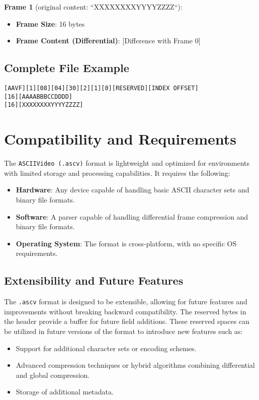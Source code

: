 \documentclass{article}
\begin{document}
\textbf{Frame 1} (original content: ``XXXXXXXXYYYYZZZZ``):

\begin{itemize}
    \item \textbf{Frame Size}: 16 bytes
    \item \textbf{Frame Content (Differential)}: [Difference with Frame 0]
\end{itemize}

\subsection{Complete File Example}

\begin{verbatim}
[AAVF][1][08][04][30][2][1][0][RESERVED][INDEX OFFSET]
[16][AAAABBBCCDDDD]
[16][XXXXXXXXYYYYZZZZ]
\end{verbatim}

\section{Compatibility and Requirements}

The \texttt{ASCIIVideo (.ascv)} format is lightweight and optimized for environments with limited storage and processing capabilities. It requires the following:

\begin{itemize}
    \item \textbf{Hardware}: Any device capable of handling basic ASCII character sets and binary file formats.
    \item \textbf{Software}: A parser capable of handling differential frame compression and binary file formats.
    \item \textbf{Operating System}: The format is cross-platform, with no specific OS requirements.
\end{itemize}

\subsection{Extensibility and Future Features}

The \texttt{.ascv} format is designed to be extensible, allowing for future features and improvements without breaking backward compatibility. The reserved bytes in the header provide a buffer for future field additions. These reserved spaces can be utilized in future versions of the format to introduce new features such as:
\begin{itemize}
    \item Support for additional character sets or encoding schemes.
    \item Advanced compression techniques or hybrid algorithms combining differential and global compression.
    \item Storage of additional metadata.
\end{itemize}
\end{document}
